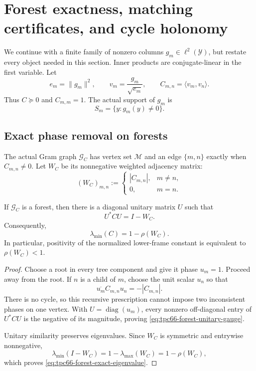 \section{Forest exactness, matching certificates, and cycle holonomy}
\label{sec:tpc66-forest-cycle}

We continue with a finite family of nonzero columns
\(g_m\in\ell^2(\mathcal Y)\), but restate every object needed in this
section.  Inner products are conjugate-linear in the first variable.  Let
\[
 e_m=\|g_m\|^2,\qquad
 v_m=\frac{g_m}{\sqrt{e_m}},\qquad
 C_{m,n}=\langle v_m,v_n\rangle.
\]
Thus \(C\succeq0\) and \(C_{m,m}=1\).  The actual support of \(g_m\) is
\[
 S_m=\{y:g_m(y)\ne0\}.
\]

\subsection{Exact phase removal on forests}

The actual Gram graph \(\mathcal G_C\) has vertex set \(\mathcal M\) and
an edge \(\{m,n\}\) exactly when \(C_{m,n}\ne0\).  Let \(W_C\) be its
nonnegative weighted adjacency matrix:
\begin{equation}
 (W_C)_{m,n}:=
 \begin{cases}
 |C_{m,n}|,&m\ne n,\\
 0,&m=n.
 \end{cases}
 \label{eq:tpc66-actual-weighted-graph}
\end{equation}

\begin{theorem}
\label{thm:tpc66-forest-exact}
If \(\mathcal G_C\) is a forest, then there is a diagonal unitary matrix
\(U\) such that
\begin{equation}
 \boxed{
 U^*CU=I-W_C.}
 \label{eq:tpc66-forest-unitary-gauge}
\end{equation}
Consequently,
\begin{equation}
 \boxed{
 \lambda_{\min}(C)=1-\rho(W_C).}
 \label{eq:tpc66-forest-exact-eigenvalue}
\end{equation}
In particular, positivity of the normalized lower-frame constant is
equivalent to \(\rho(W_C)<1\).
\end{theorem}

\begin{proof}
Choose a root in every tree component and give it phase \(u_m=1\).  Proceed
away from the root.  If \(n\) is a child of \(m\), choose the unit scalar
\(u_n\) so that
\[
 \overline{u_m}C_{m,n}u_n=-|C_{m,n}|.
\]
There is no cycle, so this recursive prescription cannot impose two
inconsistent phases on one vertex.  With \(U=\operatorname{diag}(u_m)\),
every nonzero off-diagonal entry of \(U^*CU\) is the negative of its
magnitude, proving \eqref{eq:tpc66-forest-unitary-gauge}.

Unitary similarity preserves eigenvalues.  Since \(W_C\) is symmetric and
entrywise nonnegative,
\[
 \lambda_{\min}(I-W_C)
 =1-\lambda_{\max}(W_C)
 =1-\rho(W_C),
\]
which proves \eqref{eq:tpc66-forest-exact-eigenvalue}.
\end{proof}

